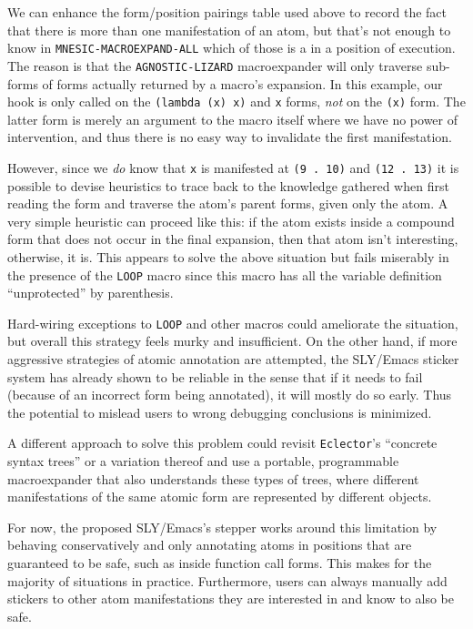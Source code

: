 \documentclass[format=sigconf]{acmart}
\begin{document}
We can enhance the form/position pairings table used above to record
the fact that there is more than one manifestation of an atom, but
that's not enough to know in \texttt{MNESIC-MACROEXPAND-ALL} which of
those is a in a position of execution.  The reason is that the
\texttt{AGNOSTIC-LIZARD} macroexpander will only traverse sub-forms of
forms actually returned by a macro's expansion.  In this example, our
hook is only called on the \texttt{(lambda (x) x)} and \texttt{x}
forms, \emph{not} on the \texttt{(x)} form.  The latter form is merely
an argument to the macro itself where we have no power of
intervention, and thus there is no easy way to invalidate the first
manifestation.

However, since we \emph{do} know that \texttt{x} is manifested at
\texttt{(9 . 10)} and \texttt{(12 . 13)} it is possible to devise
heuristics to trace back to the knowledge gathered when first reading
the form and traverse the atom's parent forms, given only the atom.  A
very simple heuristic can proceed like this: if the atom exists inside
a compound form that does not occur in the final expansion, then that
atom isn't interesting, otherwise, it is.  This appears to solve the
above situation but fails miserably in the presence of the
\texttt{LOOP} macro since this macro has all the variable definition
``unprotected'' by parenthesis.

Hard-wiring exceptions to \texttt{LOOP} and other macros could
ameliorate the situation, but overall this strategy feels murky and
insufficient.  On the other hand, if more aggressive strategies of
atomic annotation are attempted, the SLY/Emacs sticker system has
already shown to be reliable in the sense that if it needs to fail
(because of an incorrect form being annotated), it will mostly do so
early.  Thus the potential to mislead users to wrong debugging
conclusions is minimized.

A different approach to solve this problem could revisit
\texttt{Eclector}'s ``concrete syntax trees'' or a variation thereof
and use a portable, programmable macroexpander that also understands
these types of trees, where different manifestations of the same
atomic form are represented by different objects.

For now, the proposed SLY/Emacs's stepper works around this limitation
by behaving conservatively and only annotating atoms in positions that
are guaranteed to be safe, such as inside function call forms.  This
makes for the majority of situations in practice.  Furthermore, users
can always manually add stickers to other atom manifestations they are
interested in and know to also be safe.
\end{document}
